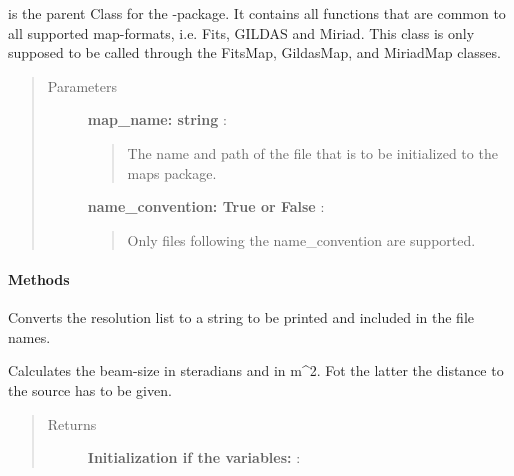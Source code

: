 \documentclass[a4paper,10pt,english]{sphinxmanual}
\begin{document}
\begin{fulllineitems}
\label{maps:astrolyze.maps.main.Map}
 is the parent Class for the -package. It contains all
functions that are common to all supported map-formats, i.e. Fits,
GILDAS and Miriad. This class is only supposed to be called through
the FitsMap, GildasMap, and MiriadMap classes.
\begin{quote}\begin{description}
\item[{Parameters }] \leavevmode
\textbf{map\_name: string} :
\begin{quote}

The name and path of the file that is to be initialized to the maps
package.
\end{quote}

\textbf{name\_convention: True or False} :
\begin{quote}

Only files following the name\_convention are supported.
\end{quote}

\end{description}\end{quote}
\paragraph{Methods}

\begin{fulllineitems}
\label{maps:astrolyze.maps.main.Map.resolutionToString}
Converts the resolution list to a string to be printed and
included in the file names.

\end{fulllineitems}


\begin{fulllineitems}
\label{maps:astrolyze.maps.main.Map.get_beam_size}
Calculates the beam-size in steradians and in m\textasciicircum{}2. Fot the latter
the distance to the source has to be given.
\begin{quote}\begin{description}
\item[{Returns }] \leavevmode
\textbf{Initialization if the variables:} :


\end{description}
\end{quote}
\end{fulllineitems}
\end{fulllineitems}
\end{document}
